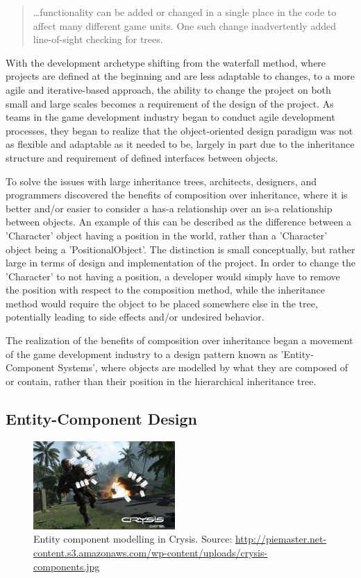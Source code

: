 \begin{quote}
\ldots functionality can be added or changed in a single place in the code to affect many different game units. One such change inadvertently added line-of-sight checking for trees\cite{wilson2003game}.
\end{quote}

With the development archetype shifting from the waterfall method, where projects are defined at the beginning and are less adaptable to changes, to a more agile and iterative-based approach, the ability to change the project on both small and large scales becomes a requirement of the design of the project. As teams in the game development industry began to conduct agile development processes, they began to realize that the object-oriented design paradigm was not as flexible and adaptable as it needed to be, largely in part due to the inheritance structure and requirement of defined interfaces between objects.

To solve the issues with large inheritance trees, architects, designers, and programmers discovered\cite{haller2002generic} the benefits of composition over inheritance, where it is better and/or easier to consider a has-a relationship over an is-a relationship between objects. An example of this can be described as the difference between a 'Character' object having a position in the world, rather than a 'Character' object being a 'PositionalObject'. The distinction is small conceptually, but rather large in terms of design and implementation of the project. In order to change the 'Character' to not having a position, a developer would simply have to remove the position with respect to the composition method, while the inheritance method would require the object to be placed somewhere else in the tree, potentially leading to side effects and/or undesired behavior.

The realization of the benefits of composition over inheritance began a movement of the game development industry to a design pattern known as 'Entity-Component Systems', where objects are modelled by what they are composed of or contain, rather than their position in the hierarchical inheritance tree.

\subsection{Entity-Component Design}

\begin{figure}[h!]
  \centering \includegraphics[width=0.48\textwidth]{Images/crysis-components.jpg}
	\caption{Entity component modelling in Crysis. Source: \url{http://piemaster.net-content.s3.amazonaws.com/wp-content/uploads/crysis-components.jpg}}
\end{figure}

